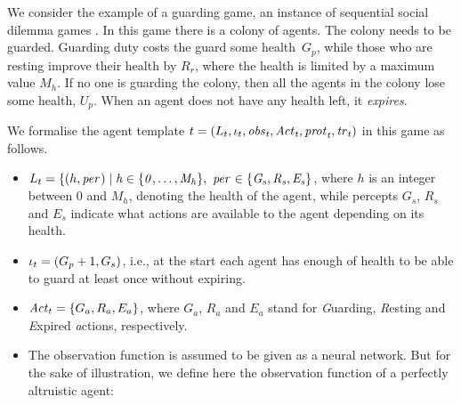 

\begin{example}

  \label{ex:agent-template}

  
  We consider the example of a guarding game, an instance of sequential social
  dilemma games \cite{LeiboZLMG17}. In this game there is a colony of
  agents. The colony needs to be guarded. Guarding duty costs the guard some
  health~$G_p$, while those who are resting improve their health by $R_r$,
  where the health is limited by a maximum value $M_h$. If no one is guarding
  the colony, then all the agents in the colony lose some health, $U_p$. When
  an agent does not have any health left, it \emph{expires}.

  We formalise the agent template
  ${t} = \left ( L_{t}, \iota_{t}, \it{obs}_{t}, \mathit{Act}_{t}, \it{prot}_{t}, \it{tr}_{t}  \right )$
  in this game as follows.

 
  \begin{itemize}[$\bullet$]
  \item
    $L_{t} = \{(h,\it{per}_{}) \mid h \in \{0,\dots,M_h\}, \ \it{per}_{} \in \{G_s,
    R_s, E_s\}$, where $h$ is an integer between 0 and $M_h$, denoting the
    health of the agent, while percepts $G_s$, $R_s$ and $E_s$ indicate what
    actions are available to the agent depending on its health.

  \item $\iota_{t} = (G_p + 1, G_s)$, i.e., at the start each agent has enough
    of health to be able to guard at least once without expiring.
    
  \item $\mathit{Act}_{t} = \{G_a, R_a, E_a\}$, where $G_a$, $R_a$ and $E_a$ stand for
    \emph{G}uarding, \emph{R}esting and \emph{E}xpired \emph{a}ctions,
    respectively.
  

  \item The observation function is assumed to be given as a neural
    network. But for the sake of illustration, we define here the observation
    function of a perfectly altruistic agent:


\end{itemize}
\end{example}
